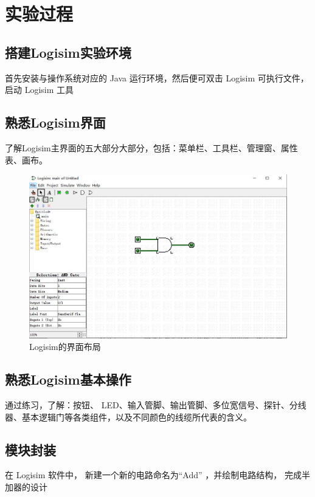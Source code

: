\documentclass[UTF8]{article}
\begin{document}
	\section{实验过程}
	\subsection{搭建Logisim实验环境}
	首先安装与操作系统对应的 Java 运行环境，然后便可双击 Logisim 可执行文件，启动 Logisim 工具\par
	\subsection{熟悉Logisim界面}
	了解Logisim主界面的五大部分大部分，包括：菜单栏、工具栏、管理窗、属性
	表、画布。\par
	\begin{figure}[H]
		\centering
		\includegraphics[scale=0.4]{layout.jpg}
		\caption{Logisim的界面布局}
		\label{layout}
	\end{figure}
	\subsection{熟悉Logisim基本操作}
	通过练习，了解：按钮、 LED、输入管脚、输出管脚、多位宽信号、探针、分线器、基本逻辑门等各类组件，以及不同颜色的线缆所代表的含义。
	\subsection{模块封装}
	在 Logisim 软件中， 新建一个新的电路命名为“Add” ，并绘制电路结构， 完成半加器的设计\par
	
\end{document}
